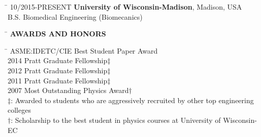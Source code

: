 \documentclass[11pt,letter]{article}
\begin{document}
\begin{tabbing}
	\hspace{3cm} \= \kill
	{\footnotesize10/2015-PRESENT} \> {\bf University of Wisconsin-Madison}, Madison, USA\\
	\> B.S.  Biomedical Engineering (Biomecanics)\\
\end{tabbing}

\begin{tabbing}
	\hspace{2cm}\=\kill
	\>  {\bf \Large AWARDS AND HONORS}
\end{tabbing}
\begin{tabbing}
	\hspace{1cm} \=  \> ASME:IDETC/CIE Best Student Paper Award\\
	2014 \> Pratt Graduate Fellowship$\ddagger$\\
	2012 \> Pratt Graduate Fellowship$\ddagger$\\
	2011 \> Pratt Graduate Fellowship$\ddagger$\\
	2007 \> Most Outstanding Physics Award$\dagger$\\
	\> 	$\ddagger$: Awarded to students who are aggressively recruited by other top engineering colleges\\
	 \> $\dagger$: Scholarship to the best student in physics courses at University of Wisconsin-EC\\
\end{tabbing}
\end{document}

